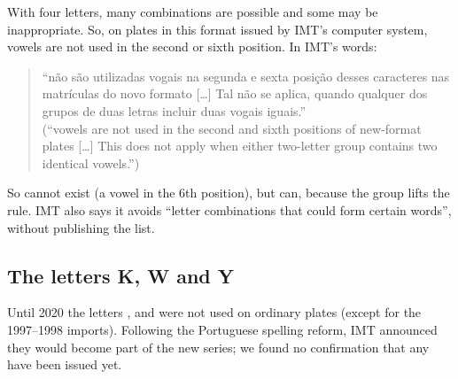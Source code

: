 With four letters, many combinations are possible and some may be inappropriate.
So, on plates in this format issued by IMT's computer system, vowels are not used
in the second or sixth position. In IMT's words:

\begin{quote}\small
“não são utilizadas vogais na segunda e sexta posição desses caracteres nas
matrículas do novo formato […] Tal não se aplica, quando qualquer dos grupos de
duas letras incluir duas vogais iguais.”\\
(“vowels are not used in the second and sixth positions of new-format plates
[…] This does not apply when either two-letter group contains two identical
vowels.”)
\end{quote}

So  cannot exist (a vowel in the 6th position), but
 can, because the  group lifts the rule. IMT also says
it avoids “letter combinations that could form certain words”, without
publishing the list.

\subsection{The letters K, W and Y}

Until 2020 the letters ,  and  were not used on
ordinary plates (except  for the 1997–1998 imports). Following the
Portuguese spelling reform, IMT announced they would become part of the new
series; we found no confirmation that any have been issued yet.
